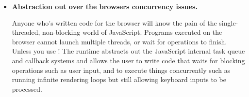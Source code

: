 \begin{itemize}
    \item \textbf{Abstraction out over the browsers concurrency issues.}
        
        Anyone who's written code for the browser will know the pain of the single-threaded, non-blocking world of JavaScript. Programs executed on the browser cannot launch multiple threads, or wait for operations to finish. Unless you use \Setanta{}! The \Setanta{} runtime abstracts out the JavaScript internal task queue and callback systems and allows the user to write code that waits for blocking operations such as user input, and to execute things concurrently such as running infinite rendering loops but still allowing keyboard inputs to be processed.

\end{itemize}
